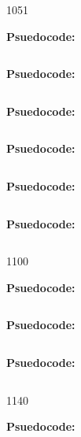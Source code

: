    {105}{1}

\textbf{Psuedocode:}
\begin{verbatim}
\end{verbatim}



\textbf{Psuedocode:}
\begin{verbatim}
\end{verbatim}



\textbf{Psuedocode:}
\begin{verbatim}
\end{verbatim}



\textbf{Psuedocode:}
\begin{verbatim}
\end{verbatim}



\textbf{Psuedocode:}
\begin{verbatim}
\end{verbatim}



\textbf{Psuedocode:}
\begin{verbatim}
\end{verbatim}


  {110}{0}

\textbf{Psuedocode:}
\begin{verbatim}
\end{verbatim}



\textbf{Psuedocode:}
\begin{verbatim}
\end{verbatim}



\textbf{Psuedocode:}
\begin{verbatim}
\end{verbatim}


   {114}{0}

\textbf{Psuedocode:}
\begin{verbatim}
\end{verbatim}


